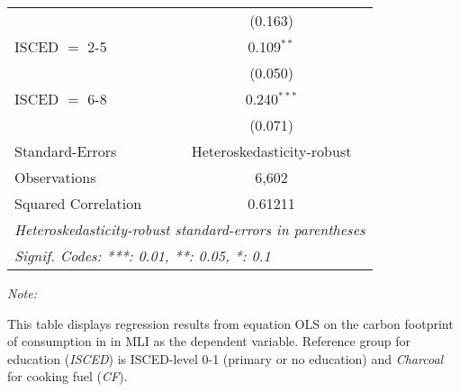 \begin{table}[htbp!]
\begin{adjustbox}{width = 1\textwidth, max height = 0.95\textheight, center}
\begin{threeparttable}[b]
\begin{tabular}{lc}
                                & (0.163)\\   
            ISCED $=$ 2-5       & 0.109$^{**}$\\   
                                & (0.050)\\   
            ISCED $=$ 6-8       & 0.240$^{***}$\\   
                                & (0.071)\\   
            \midrule 
            Standard-Errors     & Heteroskedasticity-robust \\   
            Observations        & 6,602\\  
            Squared Correlation & 0.61211\\  
            \midrule \midrule
            \multicolumn{2}{l}{\emph{Heteroskedasticity-robust standard-errors in parentheses}}\\
            \multicolumn{2}{l}{\emph{Signif. Codes: ***: 0.01, **: 0.05, *: 0.1}}\\
         \end{tabular}
         
         \begin{tablenotes}\item \medskip \textit{Note:}
            \item This table displays regression results from equation OLS on the carbon footprint of consumption in  in MLI as the dependent variable.  Reference group for education (\textit{ISCED}) is ISCED-level 0-1 (primary or no education) and \textit{Charcoal} for cooking fuel (\textit{CF}).
         \end{tablenotes}
      \end{threeparttable}
   \end{adjustbox}
\end{table}


